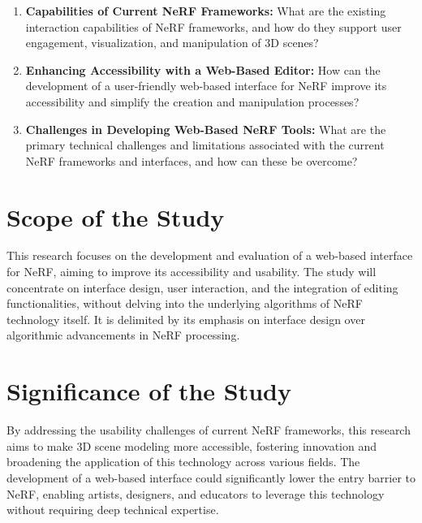 \begin{enumerate}
    \item \textbf{Capabilities of Current NeRF Frameworks:} What are the existing interaction capabilities of NeRF frameworks, and how do they support user engagement, visualization, and manipulation of 3D scenes?

    \item \textbf{Enhancing Accessibility with a Web-Based Editor:} How can the development of a user-friendly web-based interface for NeRF improve its accessibility and simplify the creation and manipulation processes?

    \item \textbf{Challenges in Developing Web-Based NeRF Tools:} What are the primary technical challenges and limitations associated with the current NeRF frameworks and interfaces, and how can these be overcome?
\end{enumerate}

\section*{Scope of the Study}
\label{sec:intro:scope}
This research focuses on the development and evaluation of a web-based interface for NeRF, aiming to improve its accessibility and usability. 
The study will concentrate on interface design, user interaction, and the integration of editing functionalities, without delving into the underlying algorithms of NeRF technology itself. 
It is delimited by its emphasis on interface design over algorithmic advancements in NeRF processing.

\section*{Significance of the Study}
\label{sec:intro:significance}
By addressing the usability challenges of current NeRF frameworks, this research aims to make 3D scene modeling more accessible, fostering innovation and broadening the application of this technology across various fields. 
The development of a web-based interface could significantly lower the entry barrier to NeRF, enabling artists, designers, and educators to leverage this technology without requiring deep technical expertise.



